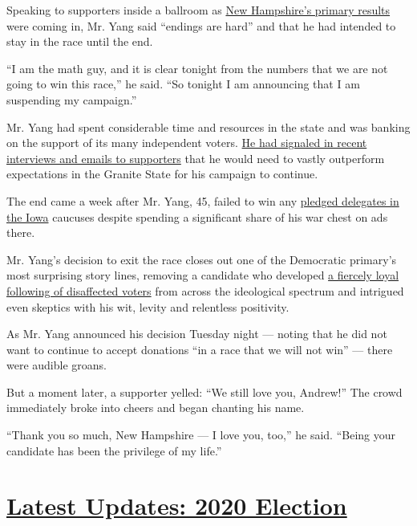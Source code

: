 Speaking to supporters inside a ballroom as
\href{https://www.nytimes.com/2020/02/11/us/politics/nh-primary-election.html}{New
Hampshire's primary results} were coming in, Mr. Yang said ``endings are
hard'' and that he had intended to stay in the race until the end.

``I am the math guy, and it is clear tonight from the numbers that we
are not going to win this race,'' he said. ``So tonight I am announcing
that I am suspending my campaign.''

Mr. Yang had spent considerable time and resources in the state and was
banking on the support of its many independent voters.
\href{https://www.nytimes.com/2020/02/10/us/politics/andrew-yang-new-hampshire.html}{He
had signaled in recent interviews and emails to supporters} that he
would need to vastly outperform expectations in the Granite State for
his campaign to continue.

The end came a week after Mr. Yang, 45, failed to win any
\href{https://www.nytimes.com/interactive/2020/02/04/us/elections/results-iowa-caucus.html}{pledged
delegates in the Iowa} caucuses despite spending a significant share of
his war chest on ads there.

Mr. Yang's decision to exit the race closes out one of the Democratic
primary's most surprising story lines, removing a candidate who
developed
\href{https://www.nytimes.com/2019/09/06/us/politics/andrew-yang-2020.html}{a
fiercely loyal following of disaffected voters} from across the
ideological spectrum and intrigued even skeptics with his wit, levity
and relentless positivity.

As Mr. Yang announced his decision Tuesday night --- noting that he did
not want to continue to accept donations ``in a race that we will not
win'' --- there were audible groans.

But a moment later, a supporter yelled: ``We still love you, Andrew!''
The crowd immediately broke into cheers and began chanting his name.

``Thank you so much, New Hampshire --- I love you, too,'' he said.
``Being your candidate has been the privilege of my life.''

\hypertarget{latest-updates-2020-election}{%
\section{\texorpdfstring{\href{https://www.nytimes.com/2020/07/31/us/elections/biden-vs-trump.html?action=click\&pgtype=Article\&state=default\&region=MAIN_CONTENT_1\&context=storylines_live_updates}{Latest
Updates: 2020
Election}}{Latest Updates: 2020 Election}}\label{latest-updates-2020-election}}

